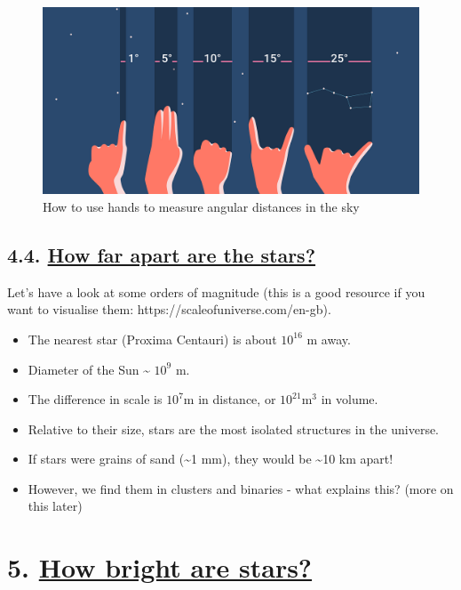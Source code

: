 \documentclass[
  letterpaper,
  DIV=11,
  numbers=noendperiod]{scrartcl}
\providecommand{\tightlist}{%
  \setlength{\itemsep}{0pt}\setlength{\parskip}{0pt}}\usepackage{longtable,booktabs,array}
\begin{document}
\begin{figure}

{\centering \includegraphics{img/measuring-sky-with-hand.png}

}

\caption{How to use hands to measure angular distances in the sky}

\end{figure}

\hypertarget{how-far-apart-are-the-stars}{%
\subsection{\texorpdfstring{4.4. \protect\hyperlink{toc0_}{How far apart
are the
stars?}}{4.4. How far apart are the stars?}}\label{how-far-apart-are-the-stars}}

Let's have a look at some orders of magnitude (this is a good resource
if you want to visualise them: https://scaleofuniverse.com/en-gb).

\begin{itemize}
\tightlist
\item
  The nearest star (Proxima Centauri) is about \(10^{16}\) m away.
\item
  Diameter of the Sun \textasciitilde{} \(10^{9}\) m.
\item
  The difference in scale is \(10^7\)m in distance, or
  \(10^{21}\)m\(^3\) in volume.
\item
  Relative to their size, stars are the most isolated structures in the
  universe.
\item
  If stars were grains of sand (\textasciitilde1 mm), they would be
  \textasciitilde10 km apart!
\item
  However, we find them in clusters and binaries - what explains this?
  (more on this later)
\end{itemize}

\hypertarget{how-bright-are-stars}{%
\section{\texorpdfstring{5. \protect\hyperlink{toc0_}{How bright are
stars?}}{5. How bright are stars?}}\label{how-bright-are-stars}}
\end{document}
